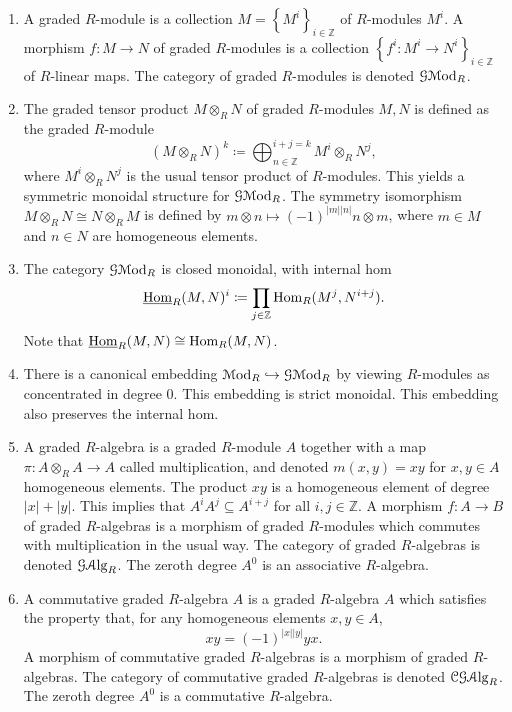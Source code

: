 \begin{enumerate}
	\item A graded $R$-module is a collection $M=\left\{ M^i \right\}_{i\in\mathbb{Z} } $ of $R$-modules $M^i$. A morphism $f : M \to N$ of graded $R$-modules is a collection $\left\{ f^i : M^i \to N^i \right\} _{i\in\mathbb{Z} } $ of $R$-linear maps. The category of graded $R$-modules is denoted $\mathcal{G} \mathcal{M}\mathrm{od} _R$.
	\item The graded tensor product $M\otimes _RN$ of graded $R$-modules $M,N$ is defined as the graded $R$-module
		\[
			(M\otimes _RN)^k \coloneqq \bigoplus_{n\in\mathbb{Z} }^{i+j=k} M^i\otimes _RN^j,
		\]
		where $M^i\otimes _RN^j$ is the usual tensor product of $R$-modules. This yields a symmetric monoidal structure for $\mathcal{G} \mathcal{M}\mathrm{od} _R$. The symmetry isomorphism $M\otimes _RN \cong N\otimes _RM$ is defined by $m\otimes n \mapsto (-1)^{\left| m \right| \left| n \right| } n\otimes m$, where $m\in M$ and $n\in N$ are homogeneous elements.
	\item The category $\mathcal{G} \mathcal{M}\mathrm{od} _R$ is closed monoidal, with internal hom
		\[
			\underline{\operatorname{Hom}}_{R}(M, N)^i \coloneqq \prod_{j\in\mathbb{Z} }\operatorname{Hom}_{R}(M^j, N^{i+j} ) 
		.\]
		Note that $\underline{\operatorname{Hom}} _R(M,N) \cong \operatorname{Hom}_{R}(M, N) $.
	\item There is a canonical embedding $\mathcal{M}\mathrm{od} _R \hookrightarrow \mathcal{G} \mathcal{M}\mathrm{od} _R$ by viewing $R$-modules as concentrated in degree 0. This embedding is strict monoidal. This embedding also preserves the internal hom.
	\item A graded $R$-algebra is a graded $R$-module $A$ together with a map $\pi : A\otimes _RA \to A$ called multiplication, and denoted $m(x,y)=xy$ for $x,y\in A$ homogeneous elements. The product $xy$ is a homogeneous element of degree $\left| x \right| +\left| y \right| $. This implies that $A^iA^j \subseteq A^{i+j} $ for all $i,j\in\mathbb{Z} $. A morphism $f : A \to B$ of graded $R$-algebras is a morphism of graded $R$-modules which commutes with multiplication in the usual way. The category of graded $R$-algebras is denoted $\mathcal{G}\mathcal{A}\mathrm{lg}_{R} $. The zeroth degree $A^0$ is an associative $R$-algebra.
	\item A commutative graded $R$-algebra $A$ is a graded $R$-algebra $A$ which satisfies the property that, for any homogeneous elements $x,y\in A$,
		\[
			xy=(-1)^{\left| x \right| \left| y \right| } yx
		.\]
		A morphism of commutative graded $R$-algebras is a morphism of graded $R$-algebras. The category of commutative graded $R$-algebras is denoted $\mathcal{C}\mathcal{G}\mathcal{A}\mathrm{lg}_{R} $. The zeroth degree $A^0$ is a commutative $R$-algebra.

\end{enumerate}
